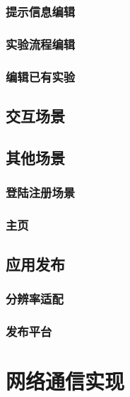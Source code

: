 \subsubsection{提示信息编辑}
\subsubsection{实验流程编辑}
\subsubsection{编辑已有实验}

\subsection{交互场景}
\subsection{其他场景}
\subsubsection{登陆注册场景}
\subsubsection{主页}
\subsection{应用发布}
\subsubsection{分辨率适配}
\subsubsection{发布平台}
\section{网络通信实现}
